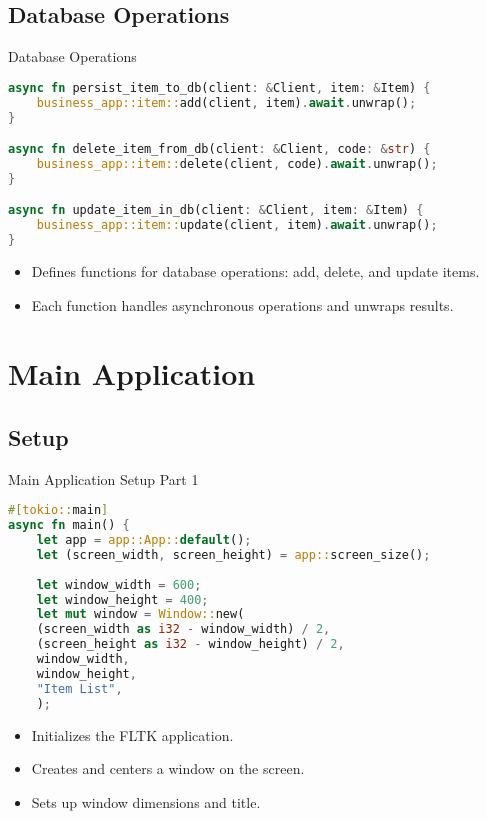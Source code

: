 \documentclass[aspectratio=169, table]{beamer}
\begin{document}
\subsection{Database Operations}
\begin{frame}[fragile]{Database Operations}
\begin{lstlisting}[language=Rust]
async fn persist_item_to_db(client: &Client, item: &Item) {
	business_app::item::add(client, item).await.unwrap();
}

async fn delete_item_from_db(client: &Client, code: &str) {
	business_app::item::delete(client, code).await.unwrap();
}

async fn update_item_in_db(client: &Client, item: &Item) {
	business_app::item::update(client, item).await.unwrap();
}
\end{lstlisting}

\begin{itemize}
\item Defines functions for database operations: add, delete, and update items.
\item Each function handles asynchronous operations and unwraps results.
\end{itemize}
\end{frame}

\section{Main Application}
\subsection{Setup}
\begin{frame}[fragile]{Main Application Setup Part 1}
\begin{lstlisting}[language=Rust]
#[tokio::main]
async fn main() {
	let app = app::App::default();
	let (screen_width, screen_height) = app::screen_size();
	
	let window_width = 600;
	let window_height = 400;
	let mut window = Window::new(
	(screen_width as i32 - window_width) / 2,
	(screen_height as i32 - window_height) / 2,
	window_width,
	window_height,
	"Item List",
	);
\end{lstlisting}

\begin{itemize}
	\item Initializes the FLTK application.
	\item Creates and centers a window on the screen.
	\item Sets up window dimensions and title.
\end{itemize}
\end{frame}
\end{document}
